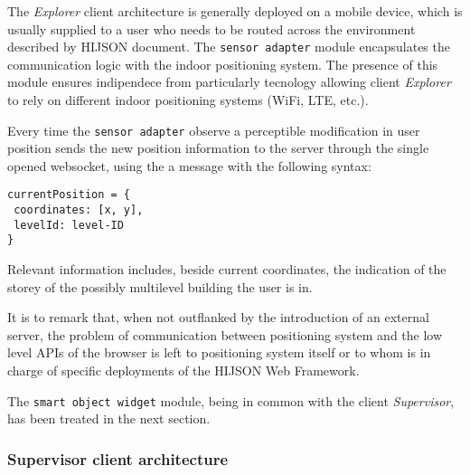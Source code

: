 The \emph{Explorer} client architecture is generally deployed on a mobile
device, which is usually supplied to a user who needs to be routed across the
environment described by HIJSON document. The {\tt sensor\ adapter} module
encapsulates the communication logic with the indoor positioning system. The
presence of this module ensures indipendece from particularly tecnology
allowing client \emph{Explorer} to rely on different indoor positioning
systems (WiFi, LTE, etc.).

Every time the {\tt sensor\ adapter} observe a perceptible
modification in user position sends the new position information to the
server through the single opened websocket, using the a message with the
following syntax:

\begin{verbatim}
currentPosition = {
 coordinates: [x, y],
 levelId: level-ID 
}
\end{verbatim}

Relevant information includes, beside current coordinates, the indication of
the storey of the possibly multilevel building the user is in.

It is to remark that, when not outflanked by the introduction of an external
server, the problem of communication between positioning system and the low
level APIs of the browser is left to positioning system itself or to whom is
in charge of specific deployments of the HIJSON Web Framework.

The {\tt smart\ object\ widget} module, being in common with the
client \emph{Supervisor}, has been treated in the next section.

\subsubsection{Supervisor client architecture}\label{supervisor-client-architecture}

